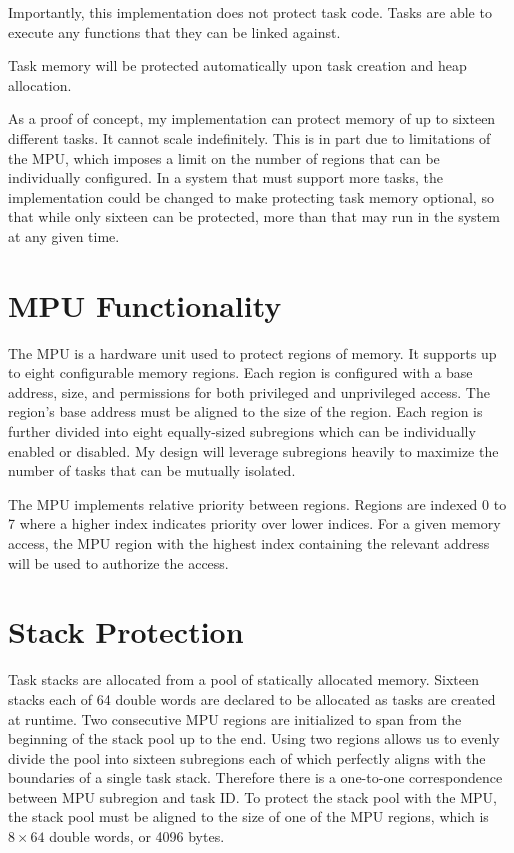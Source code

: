 Importantly, this implementation does not protect task code. Tasks are able to execute any functions that they can be linked against.

Task memory will be protected automatically upon task creation and heap allocation.

As a proof of concept, my implementation can protect memory of up to sixteen different tasks. It cannot scale indefinitely. This is in part due to limitations of the MPU, which imposes a limit on the number of regions that can be individually configured. In a system that must support more tasks, the implementation could be changed to make protecting task memory optional, so that while only sixteen can be protected, more than that may run in the system at any given time.

\section{MPU Functionality}

The MPU is a hardware unit used to protect regions of memory. It supports up to eight configurable memory regions. Each region is configured with a base address, size, and permissions for both privileged and unprivileged access. The region's base address must be aligned to the size of the region. Each region is further divided into eight equally-sized subregions which can be individually enabled or disabled. My design will leverage subregions heavily to maximize the number of tasks that can be mutually isolated.

The MPU implements relative priority between regions. Regions are indexed 0 to 7 where a higher index indicates priority over lower indices. For a given memory access, the MPU region with the highest index containing the relevant address will be used to authorize the access.

\section{Stack Protection}

Task stacks are allocated from a pool of statically allocated memory. Sixteen stacks each of 64 double words are declared to be allocated as tasks are created at runtime. Two consecutive MPU regions are initialized to span from the beginning of the stack pool up to the end. Using two regions allows us to evenly divide the pool into sixteen subregions each of which perfectly aligns with the boundaries of a single task stack. Therefore there is a one-to-one correspondence between MPU subregion and task ID. To protect the stack pool with the MPU, the stack pool must be aligned to the size of one of the MPU regions, which is $8\times64$ double words, or 4096 bytes.

